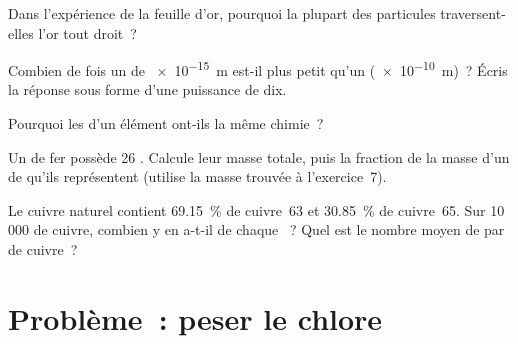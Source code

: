 \begin{exercise}[$\star\star$]\label{exo:g9:inside-the-atom:8}
Dans l'expérience de la feuille d'or, pourquoi la plupart des
particules traversent-elles l'or tout droit~?
\end{exercise}

\begin{exercise}[$\star\star$]\label{exo:g9:inside-the-atom:9}
Combien de fois un  de \qty{e-15}{m} est-il plus petit qu'un 
(\qty{e-10}{m})~? Écris la réponse sous forme d'une puissance de dix.
\end{exercise}

\begin{exercise}[$\star\star$]\label{exo:g9:inside-the-atom:10}
Pourquoi les  d'un élément ont-ils la même chimie~?
\end{exercise}

\begin{exercise}[$\star\star\star$]\label{exo:g9:inside-the-atom:11}
Un  de fer possède 26 . Calcule leur masse totale, puis
la fraction de la masse d'un  de  qu'ils
représentent (utilise la masse trouvée à l'exercice~7).
\end{exercise}

\begin{exercise}[$\star\star\star$]\label{exo:g9:inside-the-atom:12}
Le cuivre naturel contient \qty{69.15}{\percent} de cuivre~63 et
\qty{30.85}{\percent} de cuivre~65. Sur 10\,000  de cuivre,
combien y en a-t-il de chaque ~? Quel est le nombre moyen de
 par  de cuivre~?
\end{exercise}

\clearpage %
\section{Problème~: peser le chlore}

